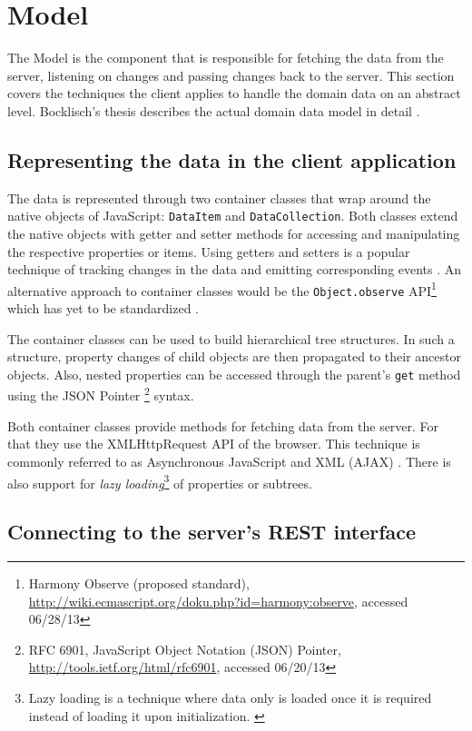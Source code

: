 \section{Model}

The Model is the component that is responsible for fetching the data from the server, listening on changes and passing changes back to the server. This section covers the techniques the client applies to handle the domain data on an abstract level. Bocklisch's thesis describes the actual domain data model in detail \cite{Bocklisch_2013}.

\subsection{Representing the data in the client application}

The data is represented through two container classes that wrap around the native objects of Ja\-va\-Script: \texttt{DataItem} and \texttt{DataCollection}. Both classes extend the native objects with getter and setter methods for accessing and manipulating the respective properties or items. Using getters and setters is a popular technique of tracking changes in the data and emitting corresponding events \cite{Osmani_2013}. An alternative approach to container classes would be the \texttt{Object.observe} API\footnote{Harmony Observe (proposed standard), \url{http://wiki.ecmascript.org/doku.php?id=harmony:observe}, accessed 06/28/13} which has yet to be standardized \cite{Waldron_2012}.

The container classes can be used to build hierarchical tree structures. In such a structure, property changes of child objects are then propagated to their ancestor objects. Also, nested properties can be accessed through the parent's \texttt{get} method using the JSON Pointer \footnote{RFC 6901, JavaScript Object Notation (JSON) Pointer, \url{http://tools.ietf.org/html/rfc6901}, accessed 06/20/13} syntax.

Both container classes provide methods for fetching data from the server. For that they use the XMLHttpRequest \cite{W3C_XHR} API of the browser. This technique is commonly referred to as Asynchronous JavaScript and XML (AJAX) \cite{Garrett_2005}. There is also support for \textit{lazy loading}\footnote{Lazy loading is a technique where data only is loaded once it is required instead of loading it upon initialization. \cite{Fowler_2002}} of properties or subtrees. 

\subsection{Connecting to the server's REST interface}

